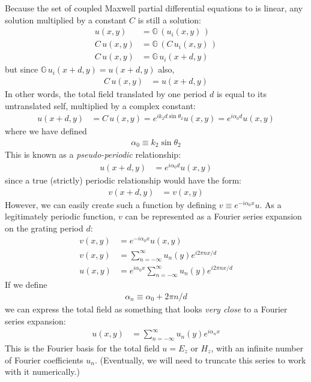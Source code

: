Because the set of coupled Maxwell partial differential equations  to  is linear, any solution multiplied by a constant $C$ is still a solution:
\begin{align}
u(x,y) &= \mathbb{G} \, ( u_i(x,y) \, ) \\
C \, u(x,y) &= \mathbb{G} \, ( C \, u_i(x,y) \, ) \\
C \, u(x, y) &= \mathbb{G} \, u_i(x+d,y)
\end{align}
but since $\mathbb{G} \, u_i(x+d,y) = u(x+d, y)$ also,
\begin{align}
C \, u(x, y) &= u(x+d, y)
\end{align}
In other words, the total field translated by one period $d$ is equal to its untranslated self, multiplied by a complex constant:
\begin{align}
u(x+d, y) &= C \, u(x, y) = e^{i k_2 d \sin \theta_2} u(x,y) = e^{i \alpha_0 d} u(x,y)
\end{align}
where we have defined 
\begin{align}
\boxed{\alpha_0 \equiv k_2 \sin \theta_2}
\end{align}
This is known as a \emph{pseudo-periodic} relationship:
\begin{align}
u(x+d, y) &= e^{i \alpha_0 d} u(x,y)
\end{align}
since a true (strictly) periodic relationship would have the form:
\begin{align}
v(x+d, y) &= v(x,y)
\end{align}
However, we can easily create such a function by defining $v \equiv e^{-i \alpha_0 x} u$.  As a legitimately periodic function, $v$ can be represented as a Fourier series expansion on the grating period $d$:
\begin{align}
v(x, y) &= e^{-i \alpha_0 x} u(x,y) \\
v(x,y) &= \sum_{n=-\infty}^{\infty} u_n(y) e^{i2\pi n x/d} \\
u(x,y) &= e^{i \alpha_0 x} \sum_{n=-\infty}^{\infty} u_n(y) e^{i2\pi n x/d}
\end{align}
If we define 
\begin{align}
\boxed{\alpha_n \equiv \alpha_0 + 2 \pi n / d}
\end{align}
we can express the total field as something that looks \emph{very close} to a Fourier series expansion:
\begin{align}
\label{eqnFourierExpansionU}
u(x,y) &=  \sum_{n=-\infty}^{\infty} u_n(y) e^{i\alpha_nx}
\end{align}
This is the Fourier basis for the total field $u = E_z$ or $H_z$, with an infinite number of Fourier coefficients $u_n$.  (Eventually, we will need to truncate this series to work with it numerically.)
